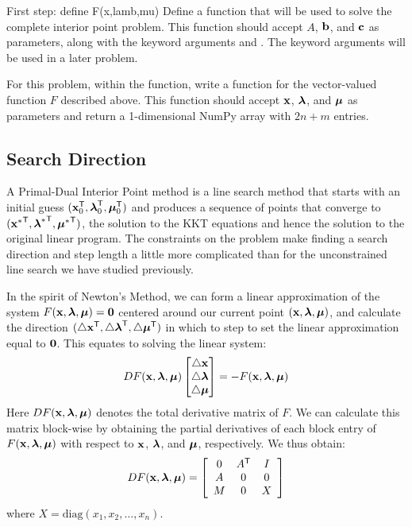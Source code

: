 \begin{problem}{First step: define F(x,lamb,mu)}{}%
Define a function  that will be used to solve the complete interior point problem.
This function should accept $A$, $\mathbf{b}$, and $\mathbf{c}$ as parameters, along with the keyword arguments  and .
The keyword arguments will be used in a later problem.

For this problem, within the  function, write a function for the vector-valued function $F$ described above.
This function should accept $\mathbf{x}$, $\boldsymbol{\lambda}$, and $\boldsymbol{\mu}$ as parameters and return a 1-dimensional NumPy array with $2n+m$ entries.
\end{problem}

\subsection*{Search Direction}

A Primal-Dual Interior Point method is a line search method that starts with an initial guess $(\mathbf{x}_0^{\mathsf T} , \boldsymbol{\lambda}_0^{\mathsf T} , \boldsymbol{\mu}_0^{\mathsf T} )$ and produces a sequence of points that converge to $({\mathbf{x}^*}^{\mathsf T} , {\boldsymbol{\lambda}^*}^{\mathsf T} , {\boldsymbol{\mu}^*}^{\mathsf T} )$, the solution to the KKT equations and hence the solution to the original linear program.
The constraints on the problem make finding a search direction and step length a little more complicated than for the unconstrained line search we have studied previously.

In the spirit of Newton's Method, we can form a linear approximation of the system $F(\mathbf{x},\boldsymbol{\lambda},\boldsymbol{\mu}) = \mathbf{0}$ centered around our current point $(\mathbf{x}, \boldsymbol{\lambda}, \boldsymbol{\mu})$, and calculate the direction $(\triangle \mathbf{x}^{\mathsf T} , \triangle \boldsymbol{\lambda}^{\mathsf T} , \triangle \boldsymbol{\mu}^{\mathsf T} )$ in which to step to set the linear approximation equal to $\mathbf{0}$.
This equates to solving the linear system:
\begin{align}
DF(\mathbf{x},\boldsymbol{\lambda},\boldsymbol{\mu})
\begin{bmatrix}\triangle \mathbf{x}\\ \triangle \boldsymbol{\lambda}\\ \triangle \boldsymbol{\mu}\end{bmatrix}
= - F(\mathbf{x},\boldsymbol{\lambda},\boldsymbol{\mu}) \label{eq:naiveNewton}
\end{align}
Here $DF(\mathbf{x},\boldsymbol{\lambda},\boldsymbol{\mu})$ denotes the total derivative matrix of $F$.
We can calculate this matrix block-wise by obtaining the partial derivatives of each block entry of $F(\mathbf{x},\boldsymbol{\lambda}, \boldsymbol{\mu})$ with respect to $\mathbf{x}$, $\boldsymbol{\lambda}$, and $\boldsymbol{\mu}$, respectively.
We thus obtain:
\[
DF(\mathbf{x},\boldsymbol{\lambda},\boldsymbol{\mu}) = \left[\begin{array}{ccc}
0 & A^{\mathsf T}  & I \\
A & 0 & 0 \\
M & 0 & X
\end{array}\right]
\]
where $X = \text{diag}(x_1,x_2,\ldots,x_n).$

